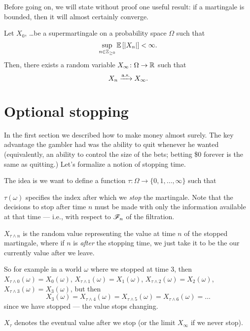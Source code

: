 Before going on, we will state without proof one useful result:
if a martingale is bounded, then it will almost certainly converge.

\begin{theorem}
	\label{thm:doob_martingale_converge}
	Let $X_0$, \dots be a supermartingale on a
	probability space $\Omega$ such that
	\[ \sup_{n \in \mathbb Z_{\ge 0}}
		\mathbb E \left[ \left\lvert X_n \right\rvert \right] < \infty. \]
	Then, there exists a random variable $X_\infty \colon \Omega \to \mathbb R$
	such that
	\[ X_n \xrightarrow{\text{a.s.}} X_\infty. \]
\end{theorem}

\section{Optional stopping}

In the first section we described how to make money almost surely.
The key advantage the gambler had was the ability to quit whenever he wanted
(equivalently, an ability to control the size of the bets;
betting \$0 forever is the same as quitting.)
Let's formalize a notion of stopping time.

The idea is we want to define a function
$\tau \colon \Omega \to \{0, 1, \dots, \infty\}$ such that
\begin{itemize}
	\ii $\tau(\omega)$ specifies the index
	after which we \emph{stop} the martingale.
	Note that the decisions to stop after time $n$
	must be made with only the information available at that time ---
	i.e., with respect to $\mathscr F_n$ of the filtration.

	\ii $X_{\tau \wedge n}$ is the random value representing the
	value at time $n$ of the stopped martingale,
	where if $n$ is \emph{after} the stopping time,
	we just take it to be the our currently value after we leave.

	So for example in a world $\omega$ where we stopped at time $3$, then
	$X_{\tau \wedge 0}(\omega) = X_0(\omega)$,
	$X_{\tau \wedge 1}(\omega) = X_1(\omega)$,
	$X_{\tau \wedge 2}(\omega) = X_2(\omega)$,
	$X_{\tau \wedge 3}(\omega) = X_3(\omega)$, but then
	\[ X_3(\omega)
		= X_{\tau \wedge 4}(\omega)
		= X_{\tau \wedge 5}(\omega)
		= X_{\tau \wedge 6}(\omega)
		= \dots
	\]
	since we have stopped --- the value stops changing.

	\ii $X_{\tau}$ denotes the eventual value after we stop
	(or the limit $X_\infty$ if we never stop).
\end{itemize}

